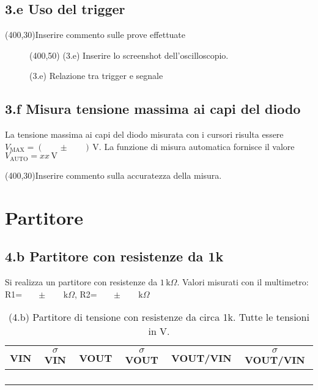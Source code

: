 \documentclass[10pt,a4paper]{article}
\newcommand{\exn}{\phantom{xxx}}
\begin{document}
\subsection*{3.e Uso del trigger}

\exn 
\par
\vspace{0.5cm}
\framebox(400,30){Inserire commento sulle prove effettuate }

\begin{figure}[h]
\centering
\framebox(400,50){ (3.e) Inserire lo screenshot dell'oscilloscopio. }
\caption{(3.e) Relazione tra trigger e segnale}
\end{figure}


\subsection*{3.f Misura tensione massima ai capi del diodo}
\par 
La tensione massima ai capi del diodo misurata con i cursori risulta essere $V_{\mathrm{MAX}}= ( \exn \pm \exn ) \,\mathrm{V}$. La funzione di misura automatica fornisce il valore $V_{\mathrm{AUTO}}= xx \,\mathrm{V}$

\vspace{0.5cm} 
\framebox(400,30){Inserire commento sulla accuratezza della misura.}






\section{Partitore}

\subsection*{4.b Partitore con resistenze da 1k}


Si realizza un partitore con resistenze da $1 \,\mathrm{k}\Omega$. Valori misurati con il multimetro: R1=$\exn \pm \exn \,\mathrm{k}\Omega$, R2=$\exn \pm \exn \,\mathrm{k}\Omega$


\begin{table}[h]
\centering
\begin{tabular}{|c|c|c|c|c|c|}
\hline 
VIN& $\sigma$ VIN  &VOUT	 & $\sigma$ VOUT& VOUT/VIN & $\sigma$ VOUT/VIN \\
\hline 
\exn & \exn & \exn & \exn & \exn &\exn \\
\exn & \exn & \exn & \exn & \exn &\exn \\
\exn & \exn & \exn & \exn & \exn &\exn \\
\exn & \exn & \exn & \exn & \exn &\exn \\
\hline 
\end{tabular} 
\caption{(4.b) Partitore di tensione con resistenze da circa 1k. Tutte le tensioni in V.\label{t:par1}}
\end{table}
\end{document}
